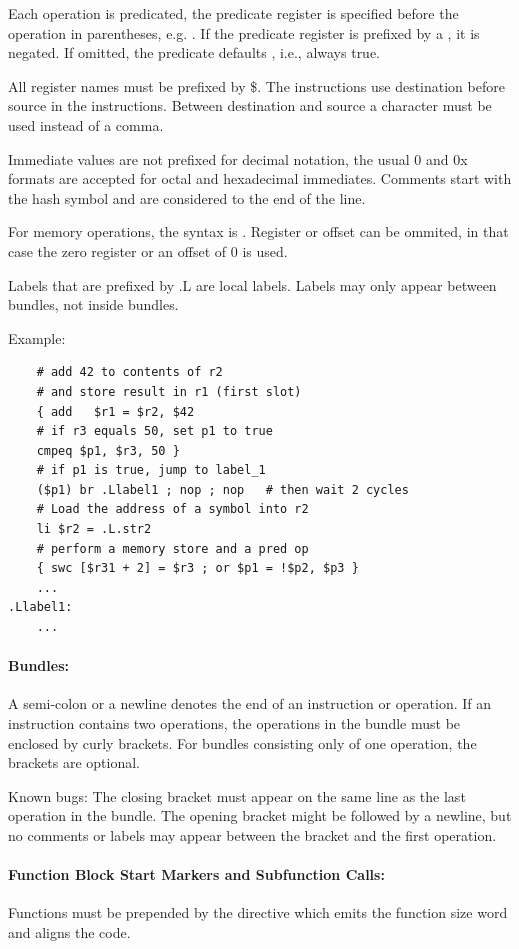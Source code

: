 Each operation is predicated, the predicate register is specified before the operation in
parentheses, e.g. .  If the predicate register is prefixed by a \code{!}, it is negated.
If omitted, the predicate defaults , i.e., always true.

All register names must be prefixed by \$. The instructions use destination before source in the
instructions. Between destination and source a \code{=} character must be used instead of a comma.

Immediate values are not prefixed for decimal notation, the usual 0 and 0x formats are accepted for
octal and hexadecimal immediates. Comments start with the hash symbol \code{\#} and are considered to the
end of the line.

For memory operations, the syntax is . Register or offset can be ommited, in
that case the zero register  or an offset of $0$ is used.

Labels that are prefixed by .L are local labels. Labels may only appear between bundles, not inside bundles.

Example:
\begin{verbatim}
    # add 42 to contents of r2
    # and store result in r1 (first slot)
    { add   $r1 = $r2, $42
    # if r3 equals 50, set p1 to true
    cmpeq $p1, $r3, 50 }
    # if p1 is true, jump to label_1
    ($p1) br .Llabel1 ; nop ; nop   # then wait 2 cycles
    # Load the address of a symbol into r2
    li $r2 = .L.str2
    # perform a memory store and a pred op
    { swc [$r31 + 2] = $r3 ; or $p1 = !$p2, $p3 }
    ...
.Llabel1:
    ...
\end{verbatim}


\paragraph{Bundles:}
A semi-colon \code{;} or a newline denotes the end of an instruction or operation. If an instruction contains
two operations, the operations in the bundle must be enclosed by curly brackets. For bundles consisting
only of one operation, the brackets are optional.

Known bugs:
The closing bracket must appear on the same line as the last operation in the bundle. The opening bracket might
be followed by a newline, but no comments or labels may appear between the bracket and the first operation.


\paragraph{Function Block Start Markers and Subfunction Calls:}
Functions must be prepended by the  directive which emits the function size word and aligns the
code.

